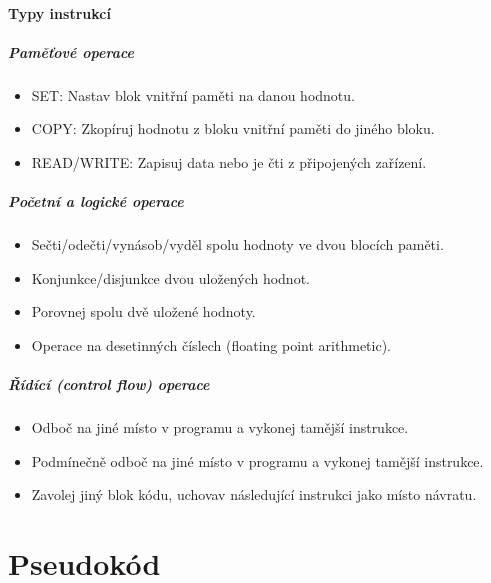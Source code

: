 \documentclass[aspectratio=169,11pt]{beamer}
\begin{document}
\subsection[Instrukce]{Typy instrukcí}

\begin{frame}
 \frametitle{Paměťové operace}
 \begin{itemize}
  \item<1-> \alert{SET}: Nastav blok vnitřní paměti na danou hodnotu.
  \item<2-> \alert{COPY}: Zkopíruj hodnotu z bloku vnitřní paměti do jiného bloku.
  \item<3-> \alert{READ/WRITE}: Zapisuj data nebo je čti z připojených zařízení.
 \end{itemize}
\end{frame}

\begin{frame}
 \frametitle{Početní a logické operace}
 \begin{itemize}
  \item<1-> \alert{Sečti/odečti/vynásob/vyděl} spolu hodnoty ve dvou blocích
   paměti.
  \item<2-> \alert{Konjunkce/disjunkce} dvou uložených hodnot.
  \item<3-> \alert{Porovnej} spolu dvě uložené hodnoty.
  \item<4-> Operace na desetinných číslech (\alert{floating point} arithmetic).
 \end{itemize}
\end{frame}

\begin{frame}
 \frametitle{Řídící (control flow) operace}
 \begin{itemize}
  \item<1-> \alert{Odboč} na jiné místo v programu a vykonej tamější instrukce.
  \item<2-> \alert{Podmínečně odboč} na jiné místo v programu a vykonej tamější
   instrukce.
  \item<3-> \alert{Zavolej} jiný blok kódu, uchovav následující instrukci jako
   místo návratu.
 \end{itemize}
\end{frame}

\part[Pseudokód]{Pseudokód}

\begin{frame}
 \partpage
\end{frame}
\end{document}
